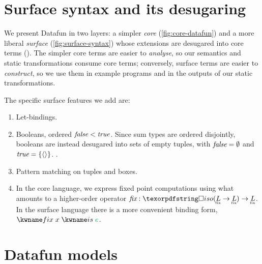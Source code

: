 



%



\section{Surface syntax and its desugaring}

We present Datafun in two layers: a simpler \emph{core}
(\cref{fig:core-datafun}) and a more liberal \emph{surface}
(\cref{fig:surface-syntax}) whose extensions are desugared into core terms
().
%
The simpler core terms are easier to \emph{analyse}, so our semantics and static
transformations consume core terms; conversely, surface terms are easier to
\emph{construct}, so we use them in example programs and in the outputs of our
static transformations.

The specific surface features we add are:
\begin{enumerate}
\item Let-bindings.

\item Booleans, ordered $\textmd{\itshape false} < \textmd{\itshape true}$. Since sum types are ordered
  disjointly, booleans are instead desugared into sets of empty tuples, with
  $\textmd{\itshape false} = \emptyset$ and $\textmd{\itshape true} = \{{\langle{}\rangle}\}$. .

\item Pattern matching on tuples and boxes. 


\item In the core language, we express fixed point computations using what
  amounts to a higher-order operator $\prim{fix} : \isof{(\fixt L \to \fixt L)}
  \to \fixt L$. In the surface language there is a more convenient binding form,
  $\efixisd x e$.

\end{enumerate}


\section{Datafun models}
\label{sec:datafun-models}

